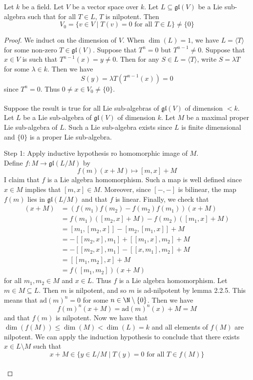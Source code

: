 \documentclass[a4paper]{article}
\begin{document}
\begin{prp}{}{} Let $k$ be a field. Let $V$ be a vector space over $k$. Let $L\subseteq\mathfrak{gl}(V)$ be a Lie sub-algebra such that for all $T\in L$, $T$ is nilpotent. Then $$V_0=\{v\in V\;|\;T(v)=0\text{ for all }T\in L\}\neq\{0\}$$ \tcbline
\begin{proof}
We induct on the dimension of $V$. When $\dim(L)=1$, we have $L=\langle T\rangle$ for some non-zero $T\in\mathfrak{gl}(V)$. Suppose that $T^n=0$ but $T^{n-1}\neq 0$. Suppose that $x\in V$ is such that $T^{n-1}(x)=y\neq 0$. Then for any $S\in L=\langle T\rangle$, write $S=\lambda T$ for some $\lambda\in k$. Then we have $$S(y)=\lambda T(T^{n-1}(x))=0$$ since $T^n=0$. Thus $0\neq x\in V_0\neq\{0\}$. \\~\\

Suppose the result is true for all Lie sub-algebras of $\mathfrak{gl}(V)$ of dimension $<k$. Let $L$ be a Lie sub-algebra of $\mathfrak{gl}(V)$ of dimension $k$. Let $M$ be a maximal proper Lie sub-algebra of $L$. Such a Lie sub-algebra exists since $L$ is finite dimensional and $\{0\}$ is a proper Lie sub-algebra. 

Step 1: Apply inductive hypothesis ro homomorphic image of $M$. \\
Define $f:M\to\mathfrak{gl}(L/M)$ by $$f(m)(x+M)\mapsto[m,x]+M$$ I claim that $f$ is a Lie algebra homomorphism. Such a map is well defined since $x\in M$ implies that $[m,x]\in M$. Moreover, since $[-,-]$ is bilinear, the map $f(m)$ lies in $\mathfrak{gl}(L/M)$ and that $f$ is linear. Finally, we check that 
\begin{align*}
[f(m_1),f(m_2)](x+M)&=(f(m_1)f(m_2)-f(m_2)f(m_1))(x+M)\\
&=f(m_1)([m_2,x]+M)-f(m_2)([m_1,x]+M)\\
&=[m_1,[m_2,x]]-[m_2,[m_1,x]]+M\\
&=-[[m_2,x],m_1]+[[m_1,x],m_2]+M\\
&=-[[m_2,x],m_1]-[[x,m_1],m_2]+M\\
&=[[m_1,m_2],x]+M\tag{Jacobi Identity}\\
&=f([m_1,m_2])(x+M)
\end{align*}
for all $m_1,m_2\in M$ and $x\in L$. Thus $f$ is a Lie algebra homomorphism.  Let $m\in M\subseteq L$. Then $m$ is nilpotent, and so $m$ is ad-nilpotent by lemma 2.2.5. This means that $\text{ad}(m)^n=0$ for some $n\in\N\setminus\{0\}$. Then we have $$f(m)^n(x+M)=\text{ad}(m)^n(x)+M=M$$ and that $f(m)$ is nilpotent. Now we have that $\dim(f(M))\leq\dim(M)<\dim(L)=k$ and all elements of $f(M)$ are nilpotent. We can apply the induction hypothesis to conclude that there exists $x\in L\setminus M$ such that $$x+M\in\{y\in L/M\;|\;T(y)=0\text{ for all }T\in f(M)\}$$~\\


\end{proof}
\end{prp}
\end{document}
